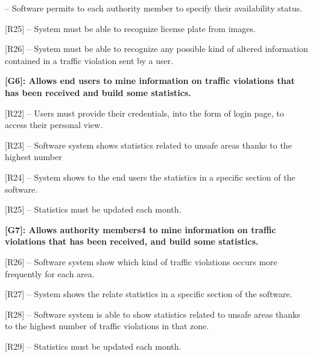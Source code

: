 \documentclass[12pt]{article}
\begin{document}
\begin{flushleft}
[R24] –  Software permits to each authority member to specify their availability status.
\vspace{2mm}

[R25] – System must be able to recognize license plate from images.
\vspace{2mm}

[R26] – System must be able to recognize any possible kind of altered information contained in a traffic violation sent by a user.
\vspace{2mm}


\vspace{4mm}
\textbf{[G6]: Allows end users to mine information on traffic violations that has been received and build some statistics.}
\vspace{2mm}

[R22] -- Users must provide their credentials, into the form of login page, to access their personal view.
\vspace{2mm}

[R23] – Software system  shows statistics related to unsafe areas thanks to the highest number 
\vspace{2mm}

[R24] –  System shows to the end users the statistics in a specific section of the software.
\vspace{2mm}

[R25] –  Statistics must be updated each month.
\vspace{2mm}

\vspace{4mm}
\textbf{ [G7]: Allows authority members4 to mine information on traffic violations that has been received, and build some statistics.}
\vspace{2mm}

[R26] -- Software system show which kind of traffic violations occurs more frequently for each area.
\vspace{2mm}

[R27] – System shows the relate statistics in a specific section of the software.
\vspace{2mm}

[R28] – Software system is able to show statistics related to unsafe areas thanks to the highest number of traffic violations in that zone.
\vspace{2mm}

[R29] –  Statistics must be updated each month.
\vspace{2mm}


\end{flushleft}
\end{document}
